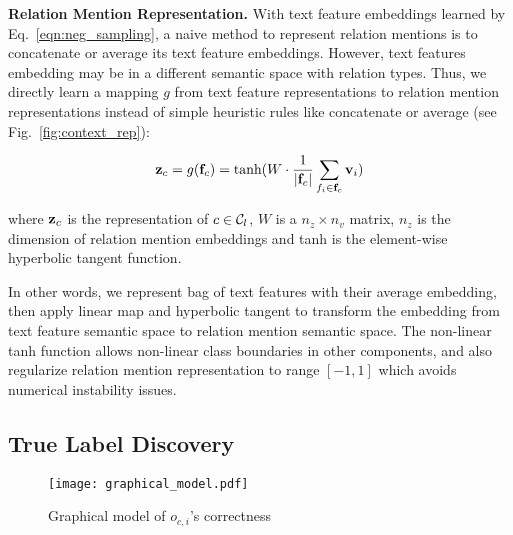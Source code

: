 \smallskip
\noindent
\textsf{\textbf{\small Relation Mention Representation.}} 
With text feature embeddings learned by Eq.~\ref{eqn:neg_sampling}, a naive method to represent relation mentions is to concatenate or average its text feature embeddings.
However, text features embedding may be in a different semantic space with relation types.
Thus, we directly learn a mapping $g$ from text feature representations to relation mention representations  \cite{van2016learning,van2016unsupervised} instead of simple heuristic rules like concatenate or average (see Fig.~\ref{fig:context_rep}):

\begin{small}
\begin{equation}
\mathbf{z}_c = g(\mathbf{f}_c)= \text{tanh}(W \cdot \frac{1}{|\mathbf{f}_c|} \sum_{f_i \in \mathbf{f}_c} \mathbf{v}_i) \label{eqn:activate}
\end{equation}
\end{small}
where  $\mathbf{z}_c$ is the representation of $c \in \mathcal{C}_l$, $W$ is a $n_z \times n_v$ matrix, $n_z$ is the dimension of relation mention embeddings and tanh is the element-wise hyperbolic tangent function.

In other words, we represent bag of text features with their average embedding,
then apply linear map and hyperbolic tangent to transform the embedding from text feature semantic space to relation mention semantic space.
The non-linear tanh function allows non-linear class boundaries in other components, and also regularize relation mention representation to range $[-1, 1]$ which avoids numerical instability issues.

\subsection{True Label Discovery }
\begin{figure}[t]
  \centering
  \centerline{
    \texttt{[image: graphical\_model.pdf]}
  }
  \caption{Graphical model of $o_{c, i}$'s correctness}
  \label{fig:graphicalModel}
\end{figure}

